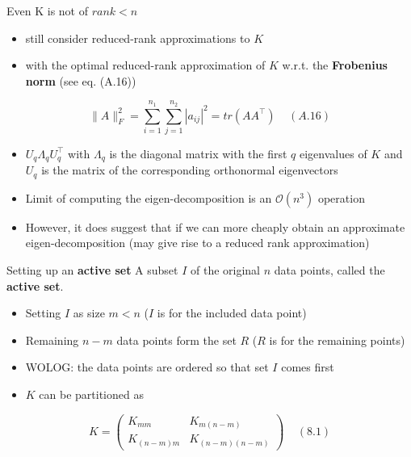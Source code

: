 \documentclass[
  ignorenonframetext,
]{beamer}
\providecommand{\tightlist}{%
  \setlength{\itemsep}{0pt}\setlength{\parskip}{0pt}}
\begin{document}
\begin{frame}{Even K is not of \(rank < n\)}
\protect\hypertarget{even-k-is-not-of-rank-n}{}
\begin{itemize}
\item
  still consider reduced-rank approximations to \(K\)
\item
  with the optimal reduced-rank approximation of \(K\) w.r.t. the
  \textbf{Frobenius norm} (see eq. (A.16))
\end{itemize}

\[
\| A\|_F^2 = \sum_{i=1}^{n_1} \sum_{j=1} ^{n_2} |a_{ij}|^2 = tr(AA^{\top}) \ \ \ \ \ (A.16)
\]

\begin{itemize}
\item
  \(U_q {\Lambda}_q U_q^{\top}\) with \({\Lambda}_q\) is the diagonal
  matrix with the first \(q\) eigenvalues of \(K\) and \(U_q\) is the
  matrix of the corresponding orthonormal eigenvectors
\item
  Limit of computing the eigen-decomposition is an \(\mathcal O(n^3)\)
  operation
\item
  However, it does suggest that if we can more cheaply obtain an
  approximate eigen-decomposition (may give rise to a reduced rank
  approximation)
\end{itemize}
\end{frame}

\begin{frame}{Setting up an \textbf{active set}}
\protect\hypertarget{setting-up-an-active-set}{}
A subset \(I\) of the original \(n\) data points, called the
\textbf{active set}.

\begin{itemize}
\tightlist
\item
  Setting \(I\) as size \(m < n\) (\(I\) is for the included data point)
\item
  Remaining \(n - m\) data points form the set \(R\) (\(R\) is for the
  remaining points)
\item
  WOLOG: the data points are ordered so that set \(I\) comes first
\item
  \(K\) can be partitioned as
\end{itemize}

\[
K =  
\begin{pmatrix}
K_{mm} & K_{m(n-m)} \\
K_{(n-m)m} &  K_{(n-m)(n-m)}  
\end{pmatrix} 
\ \ \ \ \  (8.1)
\]
\end{frame}
\end{document}
